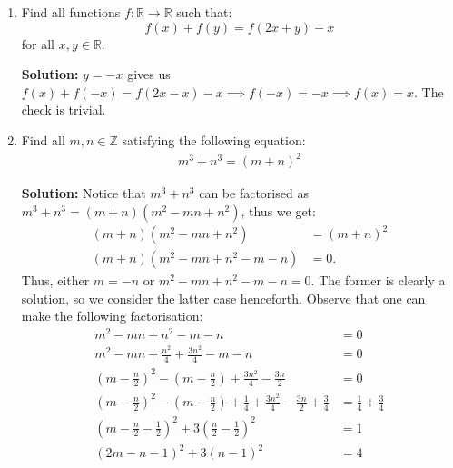 \documentclass{article}
\begin{document}
\begin{enumerate}[itemsep=12pt plus 6pt minus 6pt]
\item %
Find all functions $f:\mathbb{R}\to\mathbb{R}$ such that:
\[f(x) + f(y) = f(2x+y) - x\] for all $x,y\in\mathbb{R}$.

\textbf{Solution:}
$y = -x$ gives us $f(x) + f(-x) = f(2x-x) - x \implies f(-x) = -x \implies f(x) = x$.
The check is trivial.

\item 
Find all $m,n\in \mathbb{Z}$ satisfying the following equation:
\begin{align}
m^3 + n^3 = (m+n)^2 
\end{align}

\textbf{Solution:} Notice that $m^3 + n^3$ can be factorised as $m^3 + n^3=(m+n)(m^{2} -mn + n^{2})$, thus we get:
\begin{align*}
    (m+n)(m^{2} -mn + n^{2}) & = (m+n)^2\\
    (m+n)(m^{2} -mn + n^{2} -m -n) & = 0.
\end{align*}
Thus, either $m = -n$ or $m^{2} -mn + n^{2} -m -n = 0$. The former is clearly a solution, so we consider the latter case henceforth. Observe that one can make the following factorisation:
\begin{align}
    m^{2} -mn + n^{2} -m -n & = 0 \nonumber\\ 
    m^{2} - mn + \frac{n^{2}}{4} + \frac{3n^{2}}{4} - m -n & = 0 \nonumber\\
    \left(m - \frac{n}{2}\right)^{2} - \left(m - \frac{n}{2}\right) + \frac{3n^{2}}{4} - \frac{3n}{2} & = 0 \nonumber\\
    \left(m - \frac{n}{2}\right)^{2} - \left(m - \frac{n}{2}\right) + \frac{1}{4} + \frac{3n^{2}}{4} - \frac{3n}{2} + \frac{3}{4} & = \frac{1}{4} +\frac{3}{4} \nonumber\\
    \left(m - \frac{n}{2} - \frac{1}{2}\right)^{2} +3\left(\frac{n}{2} - \frac{1}{2}\right)^{2} & = 1 \nonumber\\
    (2m - n - 1)^{2} + 3(n-1)^{2} & = 4 
\end{align}


\end{enumerate}
\end{document}
